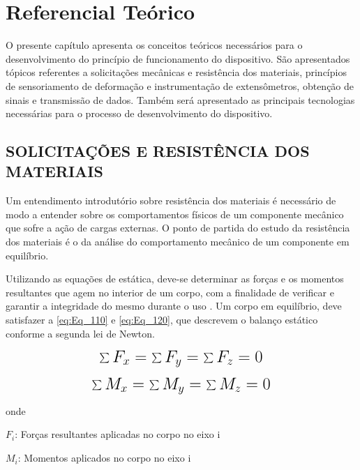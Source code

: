 

\chapter{Referencial Teórico}

O presente capítulo apresenta os conceitos teóricos necessários para o desenvolvimento do princípio de funcionamento do dispositivo.
São apresentados tópicos referentes a solicitações mecânicas e resistência dos materiais, princípios de sensoriamento de deformação e instrumentação de extensômetros,
obtenção de sinais e transmissão de dados. Também será apresentado as principais tecnologias necessárias para o processo de desenvolvimento do dispositivo.

\section{SOLICITAÇÕES E RESISTÊNCIA DOS MATERIAIS}

Um entendimento introdutório sobre resistência dos materiais é necessário de modo a entender sobre os comportamentos físicos de um componente mecânico
que sofre a ação de cargas externas. O ponto de partida do estudo da resistência dos materiais é o da análise do comportamento mecânico de um componente em equilíbrio.

Utilizando as equações de estática, deve-se determinar as forças e os momentos resultantes que agem no interior de um corpo, com a finalidade de verificar
e garantir a integridade do mesmo durante o uso \autocite{Hibbeler2010}. Um corpo em equilíbrio, deve satisfazer a \autoref{eq:Eq_110} e \autoref{eq:Eq_120}, que
descrevem o balanço estático conforme a segunda lei de Newton.

\begin{equation}\label{eq:Eq_110}%
\mbox{\fontsize{17.28}{21.6}\selectfont\( %
\sum F_{x} = \sum F_{y} = \sum F_{z} = 0
\)} %
\end{equation}

\begin{equation}\label{eq:Eq_120}%
\mbox{\fontsize{17.28}{21.6}\selectfont\( %
\sum M_{x} = \sum M_{y} = \sum M_{z} = 0
\)} %
\end{equation}

onde

$F_{i}$: Forças resultantes aplicadas no corpo no eixo i

$M_{i}$: Momentos aplicados no corpo no eixo i

\hfill

